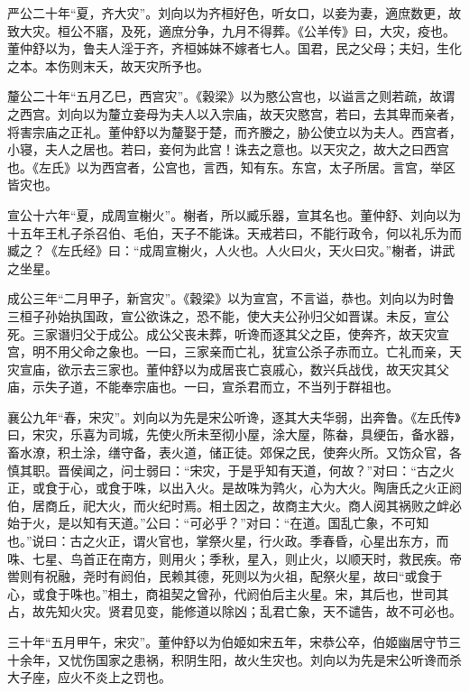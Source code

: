 \documentclass[12pt,UTF8]{ctexbook}
\begin{document}
严公二十年“夏，齐大灾”。刘向以为齐桓好色，听女口，以妾为妻，適庶数更，故致大灾。桓公不寤，及死，適庶分争，九月不得葬。《公羊传》曰，大灾，疫也。董仲舒以为，鲁夫人淫于齐，齐桓姊妹不嫁者七人。国君，民之父母；夫妇，生化之本。本伤则末夭，故天灾所予也。



釐公二十年“五月乙巳，西宫灾”。《穀梁》以为愍公宫也，以谥言之则若疏，故谓之西宫。刘向以为釐立妾母为夫人以入宗庙，故天灾愍宫，若曰，去其卑而亲者，将害宗庙之正礼。董仲舒以为釐娶于楚，而齐媵之，胁公使立以为夫人。西宫者，小寝，夫人之居也。若曰，妾何为此宫！诛去之意也。以天灾之，故大之曰西宫也。《左氏》以为西宫者，公宫也，言西，知有东。东宫，太子所居。言宫，举区皆灾也。



宣公十六年“夏，成周宣榭火”。榭者，所以臧乐器，宣其名也。董仲舒、刘向以为十五年王札子杀召伯、毛伯，天子不能诛。天戒若曰，不能行政令，何以礼乐为而臧之？《左氏经》曰：“成周宣榭火，人火也。人火曰火，天火曰灾。”榭者，讲武之坐星。



成公三年“二月甲子，新宫灾”。《穀梁》以为宣宫，不言谥，恭也。刘向以为时鲁三桓子孙始执国政，宣公欲诛之，恐不能，使大夫公孙归父如晋谋。未反，宣公死。三家谮归父于成公。成公父丧未葬，听谗而逐其父之臣，使奔齐，故天灾宣宫，明不用父命之象也。一曰，三家亲而亡礼，犹宣公杀子赤而立。亡礼而亲，天灾宣庙，欲示去三家也。董仲舒以为成居丧亡哀戚心，数兴兵战伐，故天灾其父庙，示失子道，不能奉宗庙也。一曰，宣杀君而立，不当列于群祖也。



襄公九年“春，宋灾”。刘向以为先是宋公听谗，逐其大夫华弱，出奔鲁。《左氏传》曰，宋灾，乐喜为司城，先使火所未至彻小屋，涂大屋，陈畚，具绠缶，备水器，畜水潦，积土涂，缮守备，表火道，储正徒。郊保之民，使奔火所。又饬众官，各慎其职。晋侯闻之，问士弱曰：“宋灾，于是乎知有天道，何故？”对曰：“古之火正，或食于心，或食于咮，以出入火。是故咮为鹑火，心为大火。陶唐氏之火正阏伯，居商丘，祀大火，而火纪时焉。相土因之，故商主大火。商人阅其祸败之衅必始于火，是以知有天道。”公曰：“可必乎？”对曰：“在道。国乱亡象，不可知也。”说曰：古之火正，谓火官也，掌祭火星，行火政。季春昏，心星出东方，而咮、七星、鸟首正在南方，则用火；季秋，星入，则止火，以顺天时，救民疾。帝喾则有祝融，尧时有阏伯，民赖其德，死则以为火祖，配祭火星，故曰“或食于心，或食于咮也。”相土，商祖契之曾孙，代阏伯后主火星。宋，其后也，世司其占，故先知火灾。贤君见变，能修道以除凶；乱君亡象，天不谴告，故不可必也。



三十年“五月甲午，宋灾”。董仲舒以为伯姬如宋五年，宋恭公卒，伯姬幽居守节三十余年，又忧伤国家之患祸，积阴生阳，故火生灾也。刘向以为先是宋公听谗而杀大子座，应火不炎上之罚也。
\end{document}
